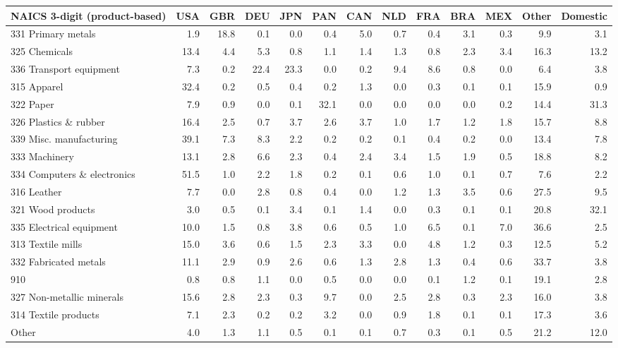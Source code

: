 \begin{tabular}{lrrrrrrrrrrrr}
\toprule
NAICS 3-digit (product-based) & USA & GBR & DEU & JPN & PAN & CAN & NLD & FRA & BRA & MEX & Other & Domestic \\
\midrule
331 Primary metals & 1.9 & 18.8 & 0.1 & 0.0 & 0.4 & 5.0 & 0.7 & 0.4 & 3.1 & 0.3 & 9.9 & 3.1 \\
325 Chemicals & 13.4 & 4.4 & 5.3 & 0.8 & 1.1 & 1.4 & 1.3 & 0.8 & 2.3 & 3.4 & 16.3 & 13.2 \\
336 Transport equipment & 7.3 & 0.2 & 22.4 & 23.3 & 0.0 & 0.2 & 9.4 & 8.6 & 0.8 & 0.0 & 6.4 & 3.8 \\
315 Apparel & 32.4 & 0.2 & 0.5 & 0.4 & 0.2 & 1.3 & 0.0 & 0.3 & 0.1 & 0.1 & 15.9 & 0.9 \\
322 Paper & 7.9 & 0.9 & 0.0 & 0.1 & 32.1 & 0.0 & 0.0 & 0.0 & 0.0 & 0.2 & 14.4 & 31.3 \\
326 Plastics \& rubber & 16.4 & 2.5 & 0.7 & 3.7 & 2.6 & 3.7 & 1.0 & 1.7 & 1.2 & 1.8 & 15.7 & 8.8 \\
339 Misc. manufacturing & 39.1 & 7.3 & 8.3 & 2.2 & 0.2 & 0.2 & 0.1 & 0.4 & 0.2 & 0.0 & 13.4 & 7.8 \\
333 Machinery & 13.1 & 2.8 & 6.6 & 2.3 & 0.4 & 2.4 & 3.4 & 1.5 & 1.9 & 0.5 & 18.8 & 8.2 \\
334 Computers \& electronics & 51.5 & 1.0 & 2.2 & 1.8 & 0.2 & 0.1 & 0.6 & 1.0 & 0.1 & 0.7 & 7.6 & 2.2 \\
316 Leather & 7.7 & 0.0 & 2.8 & 0.8 & 0.4 & 0.0 & 1.2 & 1.3 & 3.5 & 0.6 & 27.5 & 9.5 \\
321 Wood products & 3.0 & 0.5 & 0.1 & 3.4 & 0.1 & 1.4 & 0.0 & 0.3 & 0.1 & 0.1 & 20.8 & 32.1 \\
335 Electrical equipment & 10.0 & 1.5 & 0.8 & 3.8 & 0.6 & 0.5 & 1.0 & 6.5 & 0.1 & 7.0 & 36.6 & 2.5 \\
313 Textile mills & 15.0 & 3.6 & 0.6 & 1.5 & 2.3 & 3.3 & 0.0 & 4.8 & 1.2 & 0.3 & 12.5 & 5.2 \\
332 Fabricated metals & 11.1 & 2.9 & 0.9 & 2.6 & 0.6 & 1.3 & 2.8 & 1.3 & 0.4 & 0.6 & 33.7 & 3.8 \\
910 & 0.8 & 0.8 & 1.1 & 0.0 & 0.5 & 0.0 & 0.0 & 0.1 & 1.2 & 0.1 & 19.1 & 2.8 \\
327 Non-metallic minerals & 15.6 & 2.8 & 2.3 & 0.3 & 9.7 & 0.0 & 2.5 & 2.8 & 0.3 & 2.3 & 16.0 & 3.8 \\
314 Textile products & 7.1 & 2.3 & 0.2 & 0.2 & 3.2 & 0.0 & 0.9 & 1.8 & 0.1 & 0.1 & 17.3 & 3.6 \\
Other & 4.0 & 1.3 & 1.1 & 0.5 & 0.1 & 0.1 & 0.7 & 0.3 & 0.1 & 0.5 & 21.2 & 12.0 \\
\bottomrule
\end{tabular}
